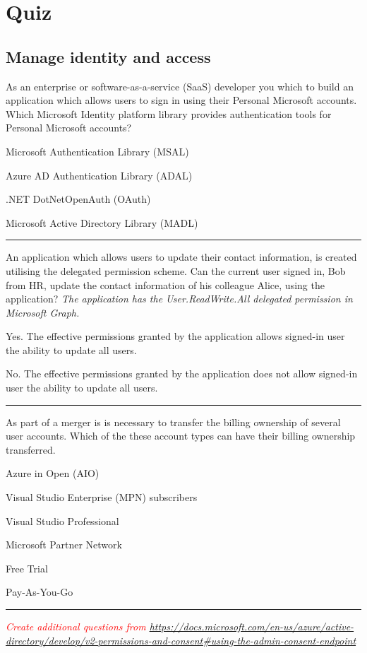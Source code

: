 \section{Quiz}
\subsection{Manage identity and access}
As an enterprise or software-as-a-service (SaaS) developer you which to build an application which allows users to sign in using their Personal Microsoft accounts. Which Microsoft Identity platform library provides authentication tools for Personal Microsoft accounts?
\begin{todolist}
\item Microsoft Authentication Library (MSAL)
\item Azure AD Authentication Library (ADAL)
\item .NET DotNetOpenAuth (OAuth)
\item Microsoft Active Directory Library (MADL)
\end{todolist}
\begin{center}\rule{6cm}{0.4pt}\end{center}
An application which allows users to update their contact information, is created utilising the delegated permission scheme. Can the current user signed in, Bob from HR, update the contact information of his colleague Alice, using the application? \textit{The application has the User.ReadWrite.All delegated permission in Microsoft Graph.}
\begin{todolist}
\item Yes. The effective permissions granted by the application allows signed-in user the ability to update all users.
\item No. The effective permissions granted by the application does not allow signed-in user the ability to update all users.
\end{todolist}
\begin{center}\rule{6cm}{0.4pt}\end{center}
As part of a merger is is necessary to transfer the billing ownership of several user accounts. Which of the these account types can have their billing ownership transferred.
\begin{todolist}
\item Azure in Open (AIO)
\item Visual Studio Enterprise (MPN) subscribers
\item Visual Studio Professional
\item Microsoft Partner Network
\item Free Trial
\item Pay-As-You-Go
\end{todolist}
\begin{center}\rule{6cm}{0.4pt}\end{center}

\vspace{1cm}
\textcolor{red}{\textit{Create additional questions from \href{https://docs.microsoft.com/en-us/azure/active-directory/develop/v2-permissions-and-consent\#using-the-admin-consent-endpoint}{https://docs.microsoft.com/en-us/azure/active-directory/develop/v2-permissions-and-consent\#using-the-admin-consent-endpoint}}}